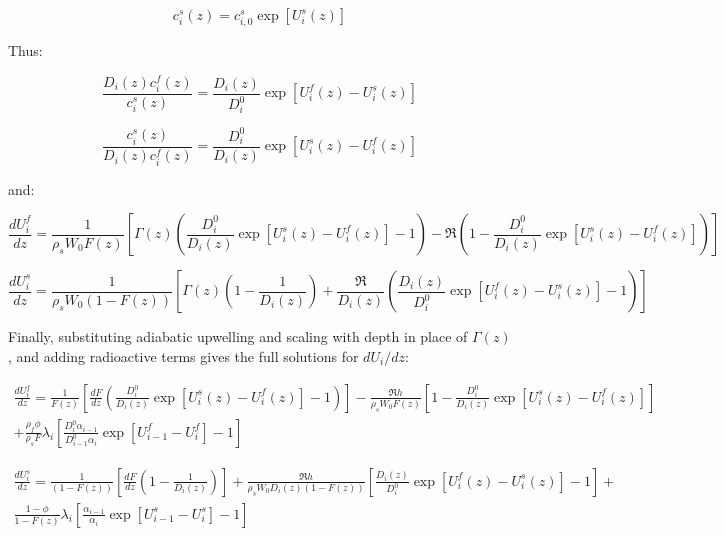 \documentclass[11pt]{article}
\begin{document}
\begin{equation}
    c_i^s(z) = c_{i,0}^s \exp[U_i^s(z)]\label{eq:43}
\end{equation}

Thus:

\begin{equation}
    \frac{D_i(z) c_i^f(z)}{c_i^s(z)} = \frac{D_i(z)}{D_i^0} \exp[U_i^f(z) - U_i^s(z)]\label{eq:44}
\end{equation}

\begin{equation}
    \frac{c_i^s(z)}{D_i(z) c_i^f(z)} = \frac{D_i^0}{D_i(z)} \exp[U_i^s(z) - U_i^f(z)]\label{eq:45}
\end{equation}

and:

\begin{equation}
    \frac{dU_i^f}{dz} = \frac{1}{\rho_s W_0 F(z)}\left[\Gamma(z)\left(\frac{D_i^0}{D_i(z)} \exp[U_i^s(z) - U_i^f(z)] - 1\right) - \Re\left(1 - \frac{D_i^0}{D_i(z)} \exp[U_i^s(z) - U_i^f(z)]\right)\right]\label{eq:46}
\end{equation}

\begin{equation}
    \frac{dU_i^s}{dz} = \frac{1}{\rho_s W_0 (1 - F(z))}\left[\Gamma(z) \left(1 - \frac{1}{D_i(z)}\right)+ \frac{\Re}{D_i(z)}\left(\frac{D_i(z)}{D_i^0} \exp[U_i^f(z) - U_i^s(z)] - 1\right) \right]\label{eq:47}
\end{equation}

Finally, substituting adiabatic upwelling and scaling with depth in place of $\Gamma(z)$, and adding radioactive terms gives the full solutions for $dU_i/dz$:

\begin{equation}\label{eq:48}
    \begin{aligned}
    	\frac{dU_i^f}{dz} = \frac{1}{F(z)}\left[\frac{dF}{dz}\left(\frac{D_i^0}{D_i(z)}\exp[U_i^s(z) - U_i^f(z)] - 1\right)\right] - \frac{\Re h}{\rho_s W_0 F(z)}\left[1 - \frac{D_i^0}{D_i(z)}\exp[U_i^s(z) - U_i^f(z)]\right] \\
	+ \frac{\rho_f \phi}{\rho_s F}\lambda_i \left[\frac{D_i^0 \alpha_{i-1}}{D_{i-1}^0 \alpha_i} \exp[U_{i-1}^f - U_i^f]-1\right]
    \end{aligned}
\end{equation}

\begin{equation}\label{eq:49}
    \begin{aligned}
    	\frac{dU_i^s}{dz} = \frac{1}{(1 - F(z))}\left[\frac{dF}{dz} \left(1 - \frac{1}{D_i(z)}\right)\right]+ \frac{\Re h}{\rho_s W_0 D_i(z)(1 - F(z))}\left[\frac{D_i(z)}{D_i^0} \exp[U_i^f(z) - U_i^s(z)] - 1 \right] + \\
	\frac{1-\phi}{1-F(z)}\lambda_i \left[\frac{\alpha_{i-1}}{\alpha_i} \exp[U_{i-1}^s - U_i^s]-1\right]
    \end{aligned}
\end{equation}
\end{document}
